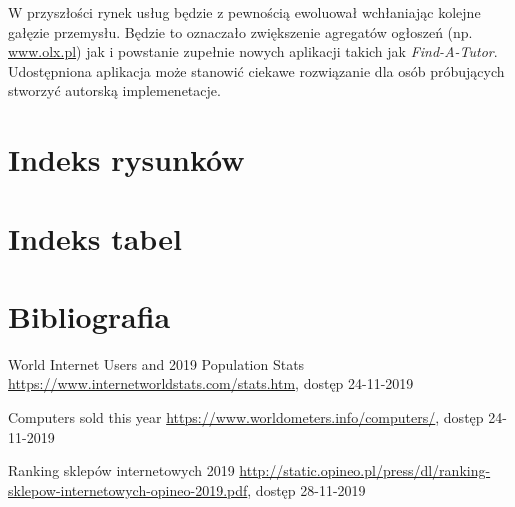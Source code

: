 \documentclass[12pt]{article}
\numberwithin{figure}{section}
\begin{document}
\begin{sloppypar}
W przyszłości rynek usług będzie z pewnością ewoluował wchłaniając kolejne gałęzie przemysłu. Będzie to oznaczało zwiększenie agregatów ogłoszeń (np. \url{www.olx.pl}) jak i powstanie zupełnie nowych aplikacji takich jak \textit{Find-A-Tutor}. Udostępniona aplikacja może stanowić ciekawe rozwiązanie dla osób próbujących stworzyć autorską implemenetacje.

    \clearpage

    \section{Indeks rysunków}
        \listoffigures
    \clearpage    
    
    \section{Indeks tabel}
        \listoftables
    \clearpage
    
    \section{Bibliografia}
    \renewcommand{\section}[2]{}
    \begin{thebibliography}{99}
    
    World Internet Users and 2019 Population Stats
    \url{https://www.internetworldstats.com/stats.htm}, dostęp 24-11-2019

    Computers sold this year
    \url{https://www.worldometers.info/computers/}, dostęp 24-11-2019
     
    Ranking sklepów internetowych 2019
    \url{http://static.opineo.pl/press/dl/ranking-sklepow-internetowych-opineo-2019.pdf}, dostęp 28-11-2019
    

\end{thebibliography}
\end{sloppypar}
\end{document}
